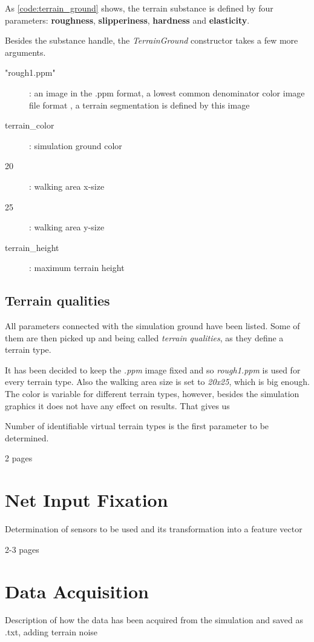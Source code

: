 As \cref{code:terrain_ground} shows, the terrain substance is defined by four parameters: \textbf{roughness}, \textbf{slipperiness}, \textbf{hardness} and \textbf{elasticity}.

Besides the substance handle, the \textit{TerrainGround} constructor takes a few more arguments.

\begin{description}
\item["rough1.ppm"] : an image in the .ppm format, a lowest common denominator color image file format \citep{misc:ppm}, a terrain segmentation is defined by this image
\item[terrain\_color] : simulation ground color
\item[20] : walking area x-size 
\item[25] : walking area y-size
\item[terrain\_height] : maximum terrain height
\end{description}

\subsection*{Terrain qualities}
All parameters connected with the simulation ground have been listed. Some of them are then picked up and being called \textit{terrain qualities}, as they define a terrain type.

It has been decided to keep the \textit{.ppm} image fixed and so \textit{rough1.ppm} is used for every terrain type. Also the walking area size is set to \textit{20x25}, which is big enough. The color is variable for different terrain types, however, besides the simulation graphics it does not have any effect on results. That gives us


Number of identifiable virtual terrain types is the first parameter to be determined. 


2 pages

\section{Net Input Fixation}
Determination of sensors to be used and its transformation into a feature vector

2-3 pages

\section{Data Acquisition}
Description of how the data has been acquired from the simulation and saved as .txt, adding terrain noise


